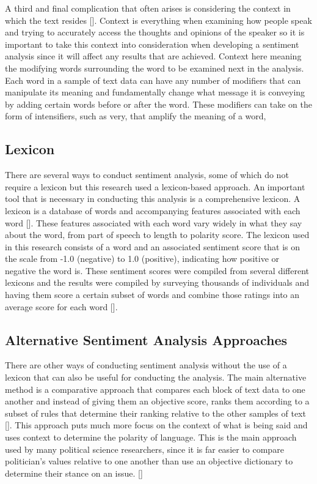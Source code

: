 A third and final complication that often arises is considering the context in which the text resides [\cite{aggarwal2012mining}].
Context is everything when examining how people speak and trying to accurately access the thoughts and opinions of the speaker so it is important to take this context into consideration when developing a sentiment analysis since it will affect any results that are achieved.
Context here meaning the modifying words surrounding the word to be examined next in the analysis.
Each word in a sample of text data can have any number of modifiers that can manipulate its meaning and fundamentally change what message it is conveying by adding certain words before or after the word.
These modifiers can take on the form of intensifiers, such as very, that amplify the meaning of a word, 

\subsection{Lexicon}
There are several ways to conduct sentiment analysis, some of which do not require a lexicon but this research used a lexicon-based approach.
An important tool that is necessary in conducting this analysis is a comprehensive lexicon.
A lexicon is a database of words and accompanying features associated with each word [\cite{taboada2011lexicon}].
These features associated with each word vary widely in what they say about the word, from part of speech to length to polarity score.
The lexicon used in this research consists of a word and an associated sentiment score that is on the scale from -1.0 (negative) to 1.0 (positive), indicating how positive or negative the word is.
These sentiment scores were compiled from several different lexicons and the results were compiled by surveying thousands of individuals and having them score a certain subset of words and combine those ratings into an average score for each word [\cite{somasundaran2010lexicon}].

\subsection{Alternative Sentiment Analysis Approaches}
There are other ways of conducting sentiment analysis without the use of a lexicon that can also be useful for conducting the analysis.
The main alternative method is a comparative approach that compares each block of text data to one another and instead of giving them an objective score, ranks them according to a subset of rules that determine their ranking relative to the other samples of text [\cite{wilson2005contextual}].
This approach puts much more focus on the context of what is being said and uses context to determine the polarity of language.
This is the main approach used by many political science researchers, since it is far easier to compare politician's values relative to one another than use an objective dictionary to determine their stance on an issue. [\cite{laver2003extracting}]

